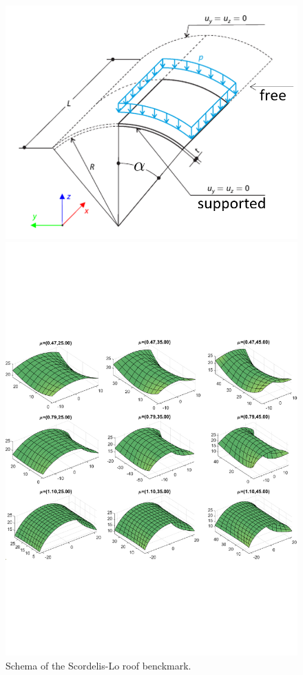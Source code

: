 \documentclass[11pt]{article}
\begin{document}
\begin{figure}
\centering
\begin{minipage}{.4\textwidth}
\includegraphics[width=\textwidth]{imgs/scrodelis-lo-roof.png}
    \caption{Schema of the Scordelis-Lo roof benckmark.}
    \label{fig:scordelislo-setting}
\end{minipage}%
\hfill
\begin{minipage}{.58\textwidth}
    \includegraphics[trim={0 6.5cm 0 7cm},clip,width=\textwidth]{imgs/scrodelis-lo-roof-solved.pdf}

\end{minipage}
\end{figure}
\end{document}
